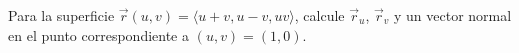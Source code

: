 Para la superficie $\vec r(u,v)=\langle u+v,u-v,uv\rangle$, calcule $\vec r_u$, $\vec r_v$ y un vector normal en el punto correspondiente a $(u,v)=(1,0)$.
